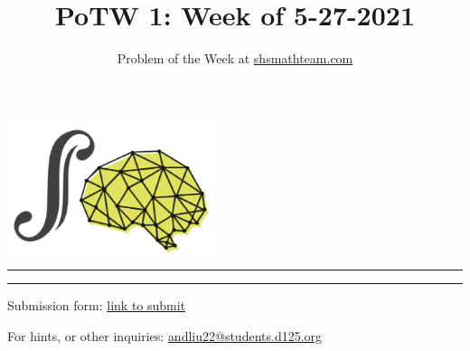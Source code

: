 \documentclass{article}
\title{{\fontfamily{lmss}\selectfont \vspace{-0.5cm}
\textbf{PoTW 1: Week of 5-27-2021}}}
\author{Problem of the Week at \href{https://shsmathteam.com/problem-of-the-week/}{shsmathteam.com}}
\date{}
\newcommand{\V}{

\vspace{\baselineskip}

}
\begin{document}
\noindent\hfill\includegraphics[width=6cm]{logo.png}\hfill\hfill\newline
\rule{\textwidth}{1pt} 

\setlength{\parindent}{0cm}
{\let\newpage\relax\maketitle}


\vspace{-0.45cm}\rule{\textwidth}{1pt} \vspace{0.3cm}

{\large Submission form: \href{https://forms.gle/EHPS5WeVKvznCnp67}{link to submit}\V}

{\large For hints, or other inquiries: \href{mailto:andliu22@students.d125.org}{andliu22@students.d125.org}\V}
\end{document}
